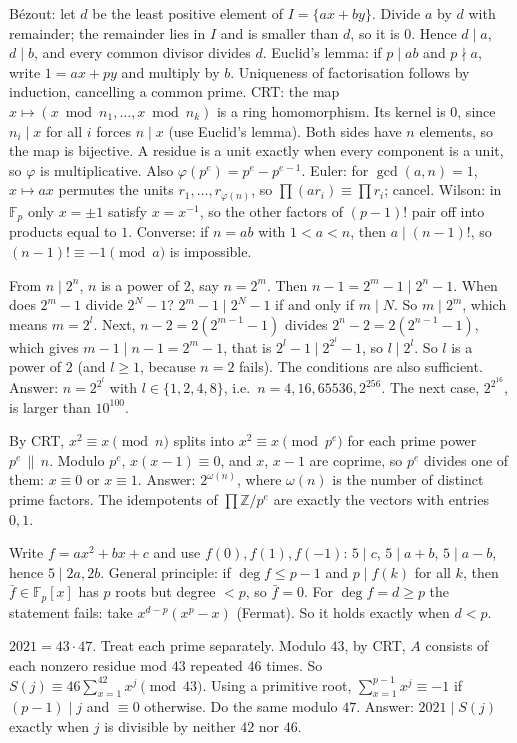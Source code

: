 \documentclass[11pt,a4paper]{article}
\begin{document}

 B\'ezout: let $d$ be the least positive element of $I=\{ax+by\}$. Divide $a$ by $d$ with remainder; the remainder lies in $I$ and is smaller than $d$, so it is $0$. Hence $d\mid a$, $d\mid b$, and every common divisor divides $d$. Euclid's lemma: if $p\mid ab$ and $p\nmid a$, write $1=ax+py$ and multiply by $b$. Uniqueness of factorisation follows by induction, cancelling a common prime.
 CRT: the map $x\mapsto(x\bmod n_1,\dots,x\bmod n_k)$ is a ring homomorphism. Its kernel is $0$, since $n_i\mid x$ for all $i$ forces $n\mid x$ (use Euclid's lemma). Both sides have $n$ elements, so the map is bijective. A residue is a unit exactly when every component is a unit, so $\varphi$ is multiplicative. Also $\varphi(p^e)=p^e-p^{e-1}$.
 Euler: for $\gcd(a,n)=1$, $x\mapsto ax$ permutes the units $r_1,\dots,r_{\varphi(n)}$, so $\prod (ar_i)\equiv\prod r_i$; cancel. Wilson: in $\mathbb F_p$ only $x=\pm1$ satisfy $x=x^{-1}$, so the other factors of $(p-1)!$ pair off into products equal to $1$.
 Converse: if $n=ab$ with $1<a<n$, then $a\mid(n-1)!$, so $(n-1)!\equiv-1\pmod a$ is impossible.

 From $n\mid 2^n$, $n$ is a power of $2$, say $n=2^m$. Then $n-1=2^m-1\mid 2^n-1$. When does $2^m-1$ divide $2^N-1$?
 $2^m-1\mid 2^N-1$ if and only if $m\mid N$. So $m\mid 2^m$, which means $m=2^l$. Next, $n-2=2(2^{m-1}-1)$ divides $2^n-2=2(2^{n-1}-1)$, which gives $m-1\mid n-1=2^m-1$, that is $2^l-1\mid 2^{2^l}-1$, so $l\mid 2^l$.
 So $l$ is a power of $2$ (and $l\geq1$, because $n=2$ fails). The conditions are also sufficient. Answer: $n=2^{2^l}$ with $l\in\{1,2,4,8\}$, i.e.\ $n=4,16,65536,2^{256}$. The next case, $2^{2^{16}}$, is larger than $10^{100}$.

 By CRT, $x^2\equiv x\pmod n$ splits into $x^2\equiv x\pmod{p^e}$ for each prime power $p^e\,\|\,n$.
 Modulo $p^e$, $x(x-1)\equiv0$, and $x$, $x-1$ are coprime, so $p^e$ divides one of them: $x\equiv0$ or $x\equiv1$. Answer: $2^{\omega(n)}$, where $\omega(n)$ is the number of distinct prime factors. The idempotents of $\prod\mathbb Z/p^e$ are exactly the vectors with entries $0,1$.

 Write $f=ax^2+bx+c$ and use $f(0),f(1),f(-1)$: $5\mid c$, $5\mid a+b$, $5\mid a-b$, hence $5\mid 2a,2b$.
 General principle: if $\deg f\le p-1$ and $p\mid f(k)$ for all $k$, then $\bar f\in\mathbb F_p[x]$ has $p$ roots but degree $<p$, so $\bar f=0$.
 For $\deg f=d\geq p$ the statement fails: take $x^{d-p}(x^p-x)$ (Fermat). So it holds exactly when $d<p$.

 $2021=43\cdot47$. Treat each prime separately. Modulo $43$, by CRT, $A$ consists of each nonzero residue mod $43$ repeated $46$ times.
 So $S(j)\equiv 46\sum_{x=1}^{42}x^j\pmod{43}$. Using a primitive root, $\sum_{x=1}^{p-1}x^j\equiv -1$ if $(p-1)\mid j$ and $\equiv 0$ otherwise. Do the same modulo $47$.
 Answer: $2021\mid S(j)$ exactly when $j$ is divisible by neither $42$ nor $46$.
\end{document}
